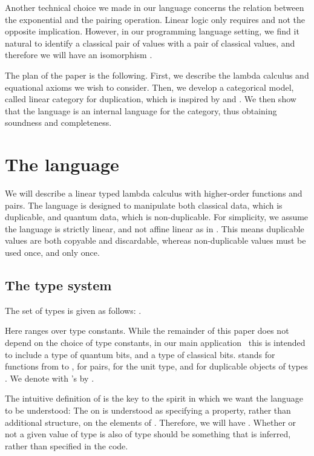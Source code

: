 \documentclass{llncs}
\begin{document}
Another technical choice we made in our language concerns the relation
between the exponential  and the pairing operation. Linear
logic only requires  and not the opposite implication. However, in our programming
language setting, we find it natural to identify a classical pair of
values with a pair of classical values, and therefore we will have an
isomorphism .

The plan of the paper is the following. First, we describe the lambda
calculus and equational axioms we wish to consider. Then, we develop a
categorical model, called linear category for duplication, which is
inspired by \cite{bierman93intuitionistic} and \cite{moggi91notions}.
We then show that the language is an internal language for the
category, thus obtaining soundness and completeness. 



\section{The language}
\label{sec:language}

We will describe a linear typed lambda calculus with higher-order
functions and pairs. The language is designed to manipulate both
classical data, which is duplicable, and quantum data, which is
non-duplicable. For simplicity, we assume the language is strictly
linear, and not affine linear as in {\cite{selinger05lambda}}. This
means duplicable values are both copyable and discardable, whereas
non-duplicable values must be used once, and only once.
\vspace{-2ex}

\subsection{The type system}

The set of types is given as follows: .

Here  ranges over type constants. While the remainder of this
paper does not depend on the choice of type constants, 
in our main application~\cite{selinger05lambda}
this is
intended to include a type  of quantum bits, and a type 
of classical bits.  stands for
functions from  to ,  for pairs,  for the
unit type, and  for duplicable objects of types . We
denote  with  's 
by .

The intuitive definition of  is the key to the spirit in
which we want the language to be understood: The  on
 is understood as specifying a property, rather than
additional structure, on the elements of . Therefore, we will have
. Whether or not a given value of type  is also of
type  should be something that is inferred, rather than specified
in the code.
\end{document}
